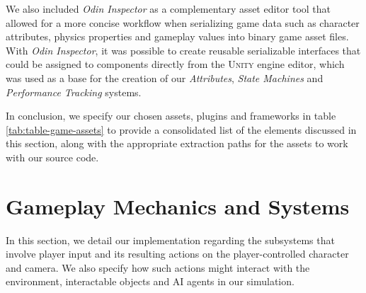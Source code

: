 We also included \emph{Odin Inspector} as a complementary asset editor tool that allowed for a more concise workflow when serializing game data such as character attributes, physics properties and gameplay values into binary game asset files. With \emph{Odin Inspector}, it was possible to create reusable serializable interfaces that could be assigned to components directly from the \textsc{Unity} engine editor, which was used as a base for the creation of our \emph{Attributes}, \emph{State Machines} and \emph{Performance Tracking} systems.

In conclusion, we specify our chosen assets, plugins and frameworks in table \ref{tab:table-game-assets} to provide a consolidated list of the elements discussed in this section, along with the appropriate extraction paths for the assets to work with our source code.




\section{Gameplay Mechanics and Systems}

In this section, we detail our implementation regarding the subsystems that involve player input and its resulting actions on the player-controlled character and camera. We also specify how such actions might interact with the environment, interactable objects and AI agents in our simulation.

